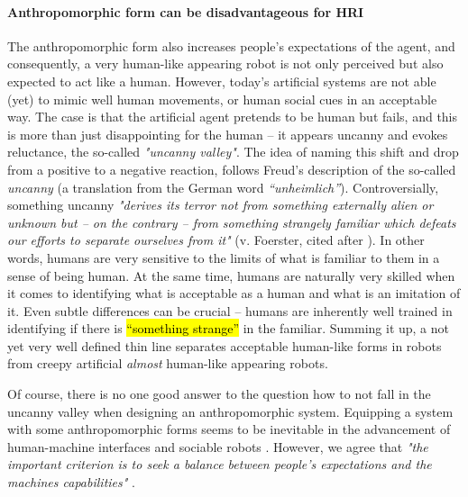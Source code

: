 \documentclass{frontiersSCNS} %
\begin{document}
 


\paragraph*{Anthropomorphic form can be disadvantageous for HRI\\}

The anthropomorphic form also 
increases people's expectations of the agent, and consequently, a very human-like 
appearing robot is not only perceived but also expected to act like a human. However, today's artificial systems are 
not able (yet) to mimic well human movements, or human social cues in an acceptable way. 
The case is that the artificial agent pretends to be human but fails, and this is 
more than just disappointing for the 
human -- it appears uncanny and evokes reluctance, the so-called 
\textit{"uncanny valley"}. The idea of naming this shift and drop from a positive to a negative reaction,
follows Freud's description of the so-called \textit{uncanny} (a translation from the German word 
\textit{``unheimlich''}). Controversially, something uncanny \textit{"derives its terror not from 
something externally alien or unknown but -- on the contrary -- from something 
strangely familiar which defeats our efforts to separate ourselves from it"} (v. Foerster, cited after \cite{hegel_understanding_2008}).
In other words, humans are very sensitive to the limits of what is familiar to them 
in a sense of being human. At the same time, humans are naturally very skilled when 
it comes to identifying what is acceptable as a human and what is an imitation 
of it. Even subtle differences can be crucial -- humans are inherently well trained 
in identifying if there is \hl{``something strange''} in the familiar.
Summing it up, a not yet very well defined thin line separates acceptable human-like forms in 
robots from creepy artificial \textit{almost} human-like appearing robots.

 
Of course, there is no one good answer to the question how to not fall in the 
uncanny valley when designing an anthropomorphic system. Equipping a system with 
some anthropomorphic forms seems to be inevitable 
\cite{duffy_anthropomorphism_2002} in the advancement of human-machine interfaces 
and sociable robots \citep{breazeal_sociable_2000}. However, we agree that 
\textit{"the important criterion is to seek a balance between people's expectations 
and the machines capabilities"} \citep{duffy_anthropomorphism_2002}. 
\end{document}
